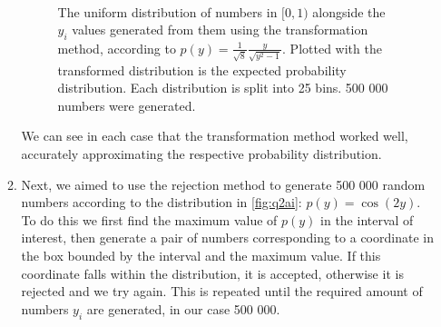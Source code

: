 \documentclass[11pt]{article}
\begin{document}
\begin{enumerate}
\begin{enumerate}
        \begin{figure}[H]%
            \centering
            \,
            \caption{The uniform distribution of numbers in $[0,1)$ alongside the $y_i$ values generated from them using the transformation method, according to $p(y)=\frac{1}{\sqrt 8}\frac{y}{\sqrt{y^2-1}}$. Plotted with the transformed distribution is the expected probability distribution. Each distribution is split into 25 bins. 500 000 numbers were generated.}
            \label{fig:q2aiii}
        \end{figure}

        We can see in each case that the transformation method worked well, accurately approximating the respective probability distribution. 

        \item Next, we aimed to use the rejection method to generate 500 000 random numbers according to the distribution in \cref{fig:q2ai}: $p(y)=\cos(2y)$. To do this we first find the maximum value of $p(y)$ in the interval of interest, then generate a pair of numbers corresponding to a coordinate in the box bounded by the interval and the maximum value. If this coordinate falls within the distribution, it is accepted, otherwise it is rejected and we try again. This is repeated until the required amount of numbers $y_i$ are generated, in our case 500 000. 
        

\end{enumerate}
\end{enumerate}
\end{document}
